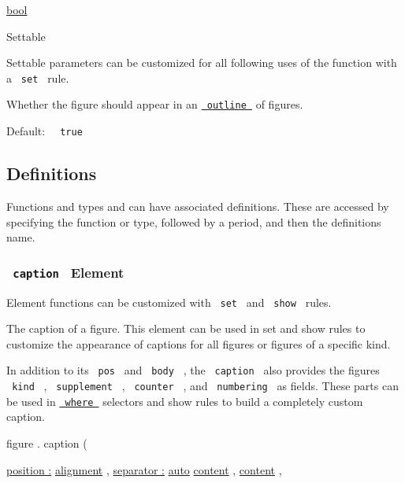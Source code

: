 \href{/docs/reference/foundations/bool/}{bool}

{{ Settable }}

\label{parameters-outlined-settable-tooltip}
Settable parameters can be customized for all following uses of the
function with a \texttt{\ set\ } rule.

Whether the figure should appear in an
\href{/docs/reference/model/outline/}{\texttt{\ outline\ }} of figures.

Default: \texttt{\ }{\texttt{\ true\ }}\texttt{\ }

\subsection{\texorpdfstring{{ Definitions
}}{ Definitions }}\label{definitions}

\label{definitions-tooltip}
Functions and types and can have associated definitions. These are
accessed by specifying the function or type, followed by a period, and
then the definition\textquotesingle s name.

\subsubsection{\texorpdfstring{\texttt{\ caption\ } {{ Element
}}}{ caption   Element }}\label{definitions-caption}

\label{definitions-caption-element-tooltip}
Element functions can be customized with \texttt{\ set\ } and
\texttt{\ show\ } rules.

The caption of a figure. This element can be used in set and show rules
to customize the appearance of captions for all figures or figures of a
specific kind.

In addition to its \texttt{\ pos\ } and \texttt{\ body\ } , the
\texttt{\ caption\ } also provides the figure\textquotesingle s
\texttt{\ kind\ } , \texttt{\ supplement\ } , \texttt{\ counter\ } , and
\texttt{\ numbering\ } as fields. These parts can be used in
\href{/docs/reference/foundations/function/\#definitions-where}{\texttt{\ where\ }}
selectors and show rules to build a completely custom caption.

figure { . } { caption } (

{ \hyperref[definitions-caption-parameters-position]{position :}
\href{/docs/reference/layout/alignment/}{alignment} , } {
\hyperref[definitions-caption-parameters-separator]{separator :}
\href{/docs/reference/foundations/auto/}{auto}
\href{/docs/reference/foundations/content/}{content} , } {
\href{/docs/reference/foundations/content/}{content} , }


